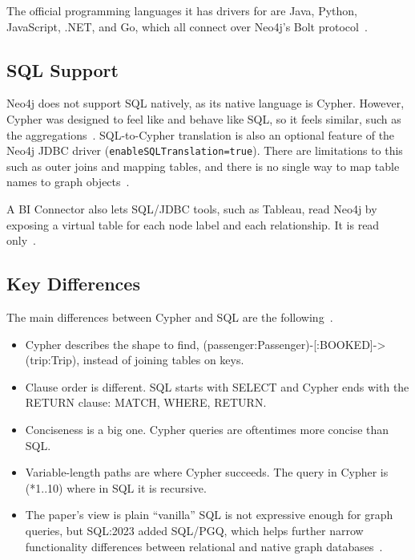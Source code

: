 \documentclass[11pt,a4paper]{article}
\begin{document}
The official programming languages it has drivers for are Java, Python, JavaScript, .NET, and Go, which all connect over Neo4j's Bolt protocol~\cite{neo4j2026drivers}.

\subsection{SQL Support}

Neo4j does not support SQL natively, as its native language is Cypher. However, Cypher was designed to feel like and behave like SQL, so it feels similar, such as the aggregations~\cite{neo4j2026cypher}. SQL-to-Cypher translation is also an optional feature of the Neo4j JDBC driver (\texttt{enableSQL\-Translation=true}). There are limitations to this such as outer joins and mapping tables, and there is no single way to map table names to graph objects~\cite{neo4j2026sql2cypher}.

A BI Connector also lets SQL/JDBC tools, such as Tableau, read Neo4j by exposing a virtual table for each node label and each relationship. It is read only~\cite{allen2020biconnector}.

\subsection{Key Differences}

The main differences between Cypher and SQL are the following~\cite{neo4j2026cypher}.

\begin{itemize}
  \item Cypher describes the shape to find, (passenger:Passenger)-[:BOOKED]->(trip:Trip), instead of joining tables on keys.
  \item Clause order is different. SQL starts with SELECT and Cypher ends with the RETURN clause: MATCH, WHERE, RETURN.
  \item Conciseness is a big one. Cypher queries are oftentimes more concise than SQL.
  \item Variable-length paths are where Cypher succeeds. The query in Cypher is (*1..10) where in SQL it is recursive.
  \item The paper's view is plain ``vanilla'' SQL is not expressive enough for graph queries, but SQL:2023 added SQL/PGQ, which helps further narrow functionality differences between relational and native graph databases~\cite{stonebraker2024whatgoesaround}.
\end{itemize}
\end{document}
